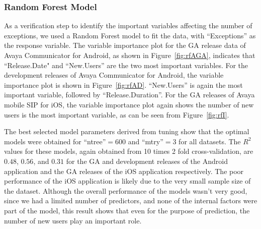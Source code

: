 \documentclass[smallcondensed]{svjour3}     %
\begin{document}
\subsubsection{Random Forest Model}
As a verification step to identify the important variables affecting the number of exceptions, we used a Random Forest model to fit the data, with ``Exceptions'' as the response variable. The variable importance plot for the GA release data of Avaya Communicator for Android, as shown in Figure~\ref{fig:rfAGA}, indicates that ``Release.Date" and ``New.Users'' are the two most important variables. For the development releases of Avaya Communicator for Android, the variable importance plot is shown in Figure~\ref{fig:rfAD}. ``New.Users'' is again the most important variable, followed by ``Release.Duration''. For the GA releases of Avaya mobile SIP for iOS, the variable importance plot again shows the number of 
new users is the most important variable, as can be seen from Figure~\ref{fig:rfI}.

The best selected model parameters derived from tuning  show that the optimal models were obtained for ``ntree''$=$600 and ``mtry''$=$3 for all datasets. The $R^2$ values for these models, again obtained from 10 times 2 fold cross-validation, are $0.48$, $0.56$, and $0.31$ for the GA and development releases of the Android application and the GA releases of the iOS application respectively. The poor performance of the iOS application is likely due to the very small sample size of the dataset. Although the overall performance of the models wasn't very good, since we had a limited number of predictors, and none of the internal factors were part of the model, this result shows that even for the purpose of prediction, the number of new users play an important role.
\end{document}
